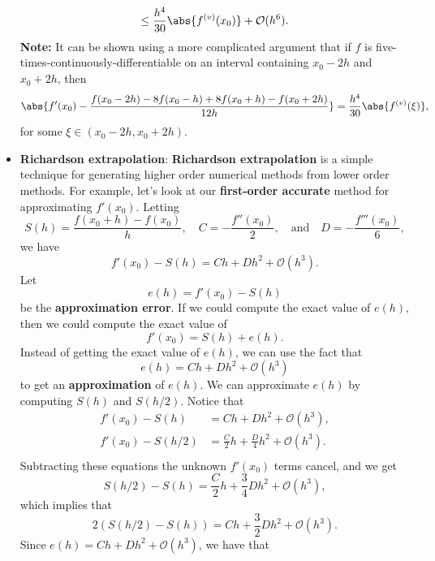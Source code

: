 \documentclass{report}
\begin{document}
\begin{itemize}
$$            \leq \frac{h^4}{30}\abs{f^{(v)}(x_0)} + \mathcal{O}(h^6).$$
            \bigbreak \noindent 
            \textbf{Note:} It can be shown using a more complicated argument that if $f$ is five-times-continuously-differentiable on an interval containing $x_0-2h$ and $x_0 + 2h$, then
            $$\abs{f'(x_0) -  \frac{f(x_0 - 2h) - 8f(x_0 - h)  + 8f(x_0 + h) - f(x_0 + 2h)}{12h}} = \frac{h^4}{30}\abs{f^{(v)}(\xi)}, $$
            for some $\xi \in (x_0-2h,x_0+2h).$
        \item \textbf{Richardson extrapolation}:
            \textbf{Richardson extrapolation} is a simple technique for generating higher order numerical methods from lower order methods.
            \bigbreak \noindent 
            For example, let's look at our \textbf{first-order accurate} method for approximating $f'(x_0)$. Letting
            $$
            S(h) = \frac{f(x_0+h)-f(x_0)}{h},
            \quad
            C = -\frac{f''(x_0)}{2},
            \quad\text{and}\quad
            D = -\frac{f'''(x_0)}{6},
            $$
            we have
            $$
            f'(x_0) - S(h) = Ch + Dh^2 + \mathcal{O}(h^3).
            $$
            \bigbreak \noindent 
            Let 
            $$e(h) = f'(x_0) - S(h)$$
            be the \textbf{approximation error}.
            \bigbreak \noindent 
            If we could compute the exact value of $e(h)$, then we could compute the exact value of 
            $$f'(x_0) = S(h) + e(h).$$ 
            Instead of getting the exact value of $e(h)$, we can use the fact that 
            $$e(h) = Ch + Dh^2 + \mathcal{O}(h^3)$$ 
            to get an \textbf{approximation} of $e(h)$.
            \bigbreak \noindent 
            We can approximate $e(h)$ by computing $S(h)$ and $S(h/2)$. Notice that
            \begin{align}
                f'(x_0) - S(h) &= Ch + Dh^2 + \mathcal{O}(h^3), \\
                f'(x_0) - S(h/2) &= \frac{C}{2}h + \frac{D}{4}h^2 + \mathcal{O}(h^3). \\
            \end{align}
            \bigbreak \noindent 
            Subtracting these equations the unknown $f'(x_0)$ terms cancel, and we get
            $$
            S(h/2) - S(h) = \frac{C}{2}h + \frac{3}{4}Dh^2 + \mathcal{O}(h^3),
            $$
            which implies that
            $$
            2(S(h/2) - S(h)) = Ch + \frac{3}{2}Dh^2 + \mathcal{O}(h^3).
            $$
            \bigbreak \noindent 
            Since $e(h) = Ch + Dh^2 + \mathcal{O}(h^3)$, we have that

\end{itemize}
\end{document}
